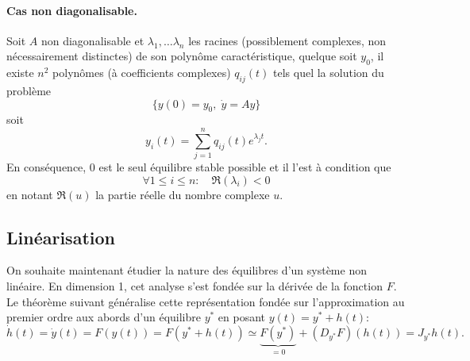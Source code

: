 \paragraph*{Cas non diagonalisable.}

\begin{theorem}
  Soit $A$ non diagonalisable et $\lambda_1, \dots \lambda_n$ les racines (possiblement complexes, non nécessairement distinctes) de son polynôme caractéristique, quelque soit $y_0$, il existe $n^2$ polynômes (à coefficients complexes) $q_{ij}(t)$ tels quel la solution du problème
  $$
  \{y(0) = y_0, \; \dot y = A y\}
  $$
  soit
  $$
  y_i(t) = \sum_{j=1}^n q_{ij}(t) e^{\lambda_j t}.
  $$
  En conséquence, 0 est le seul équilibre stable possible et il l'est à condition que
  $$
  \forall 1 \leq i \leq n: \quad \Re(\lambda_i) < 0
  $$
  en notant $\Re(u)$ la partie réelle du nombre complexe $u$.
\end{theorem}


\subsection{Linéarisation} 

On souhaite maintenant étudier la nature des équilibres d'un système non linéaire. En dimension 1, cet analyse s'est fondée sur la dérivée de la fonction $F$. Le théorème suivant généralise cette représentation fondée sur l'approximation au premier ordre aux abords d'un équilibre $y^*$ en posant $y(t) = y^* + h(t)$: 
$$
\dot h(t) = \dot y (t) = F(y(t)) = F(y^* + h(t)) 
\simeq \underset{=0}{\underbrace{F(y^*)}} + (D_{y^*} F)(h(t)) = J_{y^*} h(t).
$$

